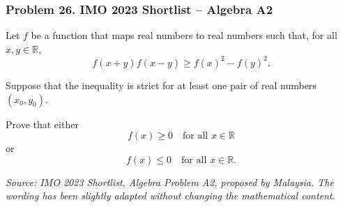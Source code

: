 \subsubsection*{Problem 26. IMO 2023 Shortlist -- Algebra A2}

\begin{exercisebox}[medium]

Let $f$ be a function that maps real numbers
to real numbers such that, for all $x,y\in\mathbb R$,
\[
f(x+y)f(x-y)\geq f(x)^2-f(y)^2.
\]

Suppose that the inequality is strict for
at least one pair of real numbers $(x_0,y_0)$.

Prove that either
\[
f(x)\geq0\quad\text{for all }x\in\mathbb R
\]
or
\[
f(x)\leq0\quad\text{for all }x\in\mathbb R.
\]

\medskip
\noindent
\textit{Source: IMO 2023 Shortlist, Algebra Problem A2,
proposed by Malaysia. The wording has been slightly
adapted without changing the mathematical content.}


\end{exercisebox}